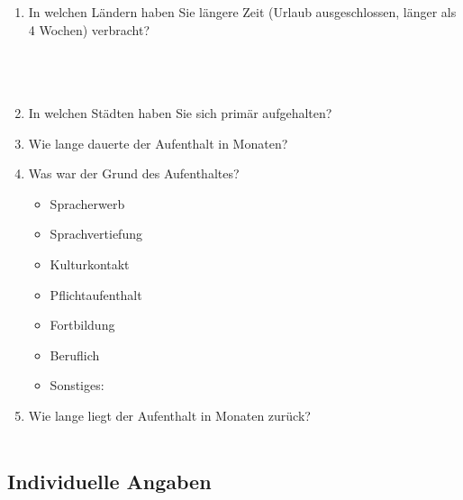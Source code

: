 \begin{enumerate}[resume]
\item In welchen Ländern haben Sie längere Zeit (Urlaub ausgeschlossen, länger als 4 Wochen) verbracht?\\\label{App1:verg}
	   \underline{\hspace{7.5cm}}\\
       \underline{\hspace{7.5cm}}\\
       \underline{\hspace{7.5cm}}\\
       \underline{\hspace{7.5cm}}


\item In welchen Städten haben Sie sich primär aufgehalten?\\
	   \underline{\hspace{7.5cm}}


\item Wie lange dauerte der Aufenthalt in Monaten?\\
	   \underline{\hspace{7.5cm}}


\item Was war der Grund des Aufenthaltes?

		\begin{itemize}
		\item[\Circle] Spracherwerb 
        \item[\Circle] Sprachvertiefung 
        \item[\Circle] Kulturkontakt
        \item[\Circle] Pflichtaufenthalt
        \item[\Circle] Fortbildung
        \item[\Circle] Beruflich
        \item[\Circle] Sonstiges:~\underline{\hspace{7.5cm}}
        \end{itemize}


\item Wie lange liegt der Aufenthalt in Monaten zurück?\\
	   \underline{\hspace{7.5cm}}\\

\end{enumerate}

\subsection*{Individuelle Angaben}
\label{App1:SectionDemographie}

